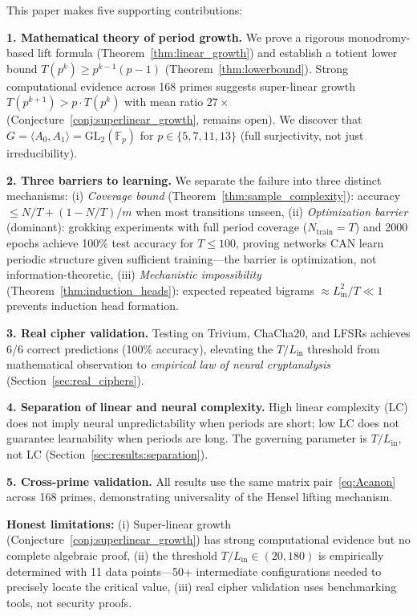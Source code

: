 \documentclass[11pt]{article}
\theoremstyle{plain}
\theoremstyle{definition}
\begin{document}
This paper makes five supporting contributions:

\textbf{1. Mathematical theory of period growth.} We prove a rigorous monodromy-based lift formula (Theorem~\ref{thm:linear_growth}) and establish a totient lower bound $T(p^k) \geq p^{k-1}(p-1)$ (Theorem~\ref{thm:lowerbound}). Strong computational evidence across 168 primes suggests super-linear growth $T(p^{k+1}) > p \cdot T(p^k)$ with mean ratio $27\times$ (Conjecture~\ref{conj:superlinear_growth}, remains open). We discover that $G = \langle A_0, A_1 \rangle = \mathrm{GL}_2(\mathbb{F}_p)$ for $p \in \{5,7,11,13\}$ (full surjectivity, not just irreducibility).

\textbf{2. Three barriers to learning.} We separate the failure into three distinct mechanisms: (i) \emph{Coverage bound} (Theorem~\ref{thm:sample_complexity}): accuracy $\leq N/T + (1-N/T)/m$ when most transitions unseen, (ii) \emph{Optimization barrier} (dominant): grokking experiments with full period coverage ($N_{\mathrm{train}} = T$) and 2000 epochs achieve 100\% test accuracy for $T \leq 100$, proving networks CAN learn periodic structure given sufficient training—the barrier is optimization, not information-theoretic, (iii) \emph{Mechanistic impossibility} (Theorem~\ref{thm:induction_heads}): expected repeated bigrams $\approx L_{\mathrm{in}}^2/T \ll 1$ prevents induction head formation.

\textbf{3. Real cipher validation.} Testing on Trivium, ChaCha20, and LFSRs achieves 6/6 correct predictions (100\% accuracy), elevating the $T/L_{\mathrm{in}}$ threshold from mathematical observation to \emph{empirical law of neural cryptanalysis} (Section~\ref{sec:real_ciphers}).

\textbf{4. Separation of linear and neural complexity.} High linear complexity (LC) does not imply neural unpredictability when periods are short; low LC does not guarantee learnability when periods are long. The governing parameter is $T/L_{\mathrm{in}}$, not LC (Section~\ref{sec:results:separation}).

\textbf{5. Cross-prime validation.} All results use the same matrix pair~\eqref{eq:Acanon} across 168 primes, demonstrating universality of the Hensel lifting mechanism.

\textbf{Honest limitations:} (i) Super-linear growth (Conjecture~\ref{conj:superlinear_growth}) has strong computational evidence but no complete algebraic proof, (ii) the threshold $T/L_{\mathrm{in}} \in (20, 180)$ is empirically determined with 11 data points—50+ intermediate configurations needed to precisely locate the critical value, (iii) real cipher validation uses benchmarking tools, not security proofs.
\end{document}
